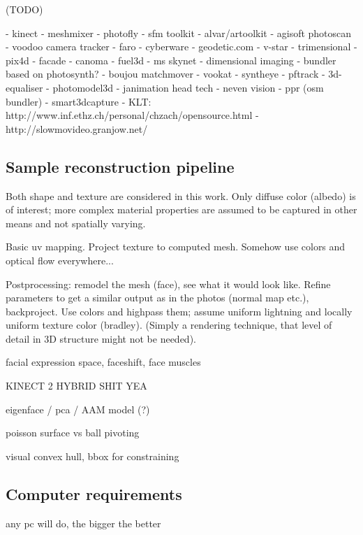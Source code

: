 
(TODO)

- kinect
- meshmixer
- photofly
- sfm toolkit
- alvar/artoolkit
- agisoft photoscan
- voodoo camera tracker
- faro
- cyberware
- geodetic.com
- v-star
- trimensional
- pix4d
- facade
- canoma
- fuel3d
- ms skynet
- dimensional imaging
- bundler based on photosynth?
- boujou matchmover
- vookat
- syntheye
- pftrack
- 3d-equaliser
- photomodel3d
- janimation head tech
- neven vision
- ppr (osm bundler)
- smart3dcapture
- KLT: http://www.inf.ethz.ch/personal/chzach/opensource.html
- http://slowmovideo.granjow.net/


\subsection{Sample reconstruction pipeline} %

Both shape and texture are considered in this work. Only diffuse color (albedo) is of interest; more complex material properties are assumed to be captured in other means and not spatially varying.

Basic uv mapping. Project texture to computed mesh. Somehow use colors and optical flow everywhere...

Postprocessing: remodel the mesh (face), see what it would look like. Refine parameters to get a similar output as in the photos (normal map etc.), backproject. Use colors and highpass them; assume uniform lightning and locally uniform texture color (bradley). (Simply a rendering technique, that level of detail in 3D structure might not be needed).

facial expression space, faceshift, face muscles

KINECT 2 HYBRID SHIT YEA

eigenface / pca / AAM model (?)

poisson surface vs ball pivoting

visual convex hull, bbox for constraining


\subsection{Computer requirements} %

any pc will do, the bigger the better


